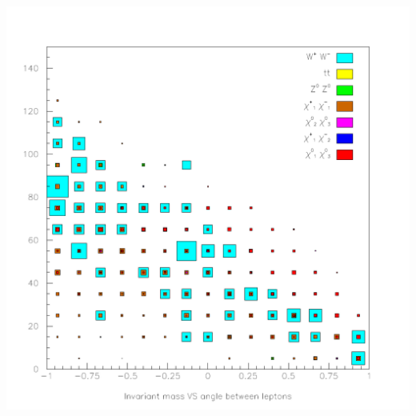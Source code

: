 \documentclass[landscape]{article}
\begin{document}
\begin{center} \includegraphics[height=\textheight]{pretty_9.pdf} \end{center}
\end{document}
